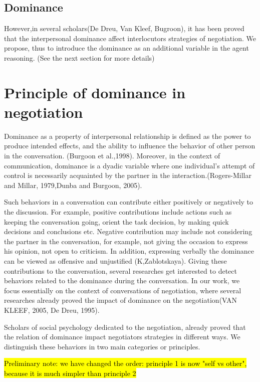 \documentclass{llncs}
\begin{document}
\subsection{Dominance}

However,in several scholars(De Dreu, Van Kleef, Bugroon), it has been proved that the interpersonal dominance affect interlocutors strategies of negotiation. We propose, thus to introduce the dominance as an additional variable in the agent reasoning. (See the next section for more details)


\section{Principle of dominance in negotiation}
\par Dominance as a property of interpersonal relationship is defined as the power to produce intended effects, and the ability to influence the behavior of other person in the conversation. (Burgoon et al.,1998).
Moreover, in the context of communication, dominance is a dyadic variable where one individual's attempt of control is necessarily acquainted by the partner in the interaction.(Rogers-Millar and Millar, 1979,Dunba and Burgoon, 2005). 

\par Such behaviors in a conversation can contribute either positively or negatively to the discussion. For example, positive contributions include actions such as keeping the conversation going, orient the task decision, by making quick decisions and conclusions etc. Negative contribution may include not considering the partner in the conversation, for example, not giving the occasion to express his opinion, not open to criticism. In addition, expressing verbally the dominance can be viewed as offensive and unjustified (K,Zablotskaya). Giving these contributions to the conversation, several researches get interested to detect  behaviors related to the dominance during the conversation. In our work, we focus essentially on the context of conversations of negotiation, where several researches already proved the impact of dominance on the negotiation(VAN KLEEF, 2005, De Dreu, 1995). 

\par Scholars of social psychology dedicated to the negotiation, already proved that the relation of dominance impact negotiators strategies in different ways. We distinguish these behaviors in two main categories or principles.

\hl{Preliminary note: we have changed the order: principle 1 is now "self vs other", because it is much simpler than principle 2}
\end{document}
